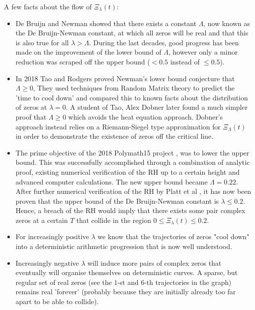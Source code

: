 \documentclass[a4paper,11pt,twoside]{amsart}
\begin{document}
A few facts about the flow of $\Xi_{\lambda}(t)$:
\begin{itemize}
  \item De Bruijn and Newman showed that there exists a constant $\Lambda$, now known as the De Bruijn-Newman constant, at which all zeros will be real and that this is also true for all $\lambda > \Lambda$. During the last decades, good progress has been made on the improvement of the lower bound of $\Lambda$, however only a minor reduction was scraped off the upper bound ($<0.5$ instead of $\le 0.5$).
  \item In 2018 Tao and Rodgers \cite{rot} proved Newman's lower bound conjecture that $\Lambda \ge 0$, They used techniques from Random Matrix theory to predict the 'time to cool down' and compared this to known facts about the distribution of zeros at $\lambda = 0$. A student of Tao, Alex Dobner later found a much simpler proof \cite{dob} that $\Lambda \ge 0$ which avoids the heat equation approach. Dobner’s approach instead relies on a Riemann-Siegel type approximation for $\Xi_{\Lambda}(t)$ in order to demonstrate the existence of zeros off the critical line.
   \item The prime objective of the 2018 Polymath15 project \cite{pol}, was to lower the upper bound. This was successfully accomplished through a combination of analytic proof, existing numerical verification of the RH up to a certain height and advanced computer calculations. The new upper bound became $\Lambda = 0.22$. After further numerical verification of the RH by Platt et al \cite{pla}, it has now been proven that the upper bound of the De Bruijn-Newman constant is $\lambda \le 0.2$. Hence, a breach of the RH would imply that there exists some pair complex zeros at a certain $T$ that collide in the region $0 \le \Xi_{\lambda}(t) \le 0.2$.
  \item For increasingly positive $\lambda$ we know that the trajectories of zeros "cool down" into a deterministic arithmetic progression that is now well understood.
  \item Increasingly negative $\lambda$ will induce more pairs of complex zeros that eventually will organise themselves on deterministic curves. A sparse, but regular set of real zeros (see the $1$-st and $6$-th trajectories in the graph) remains real 'forever' (probably because they are initially already too far apart to be able to collide). 
\end{itemize}

\pagebreak
\end{document}
